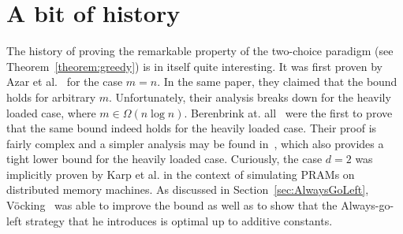 \documentclass[a4paper,12pt]{article}
\begin{document}
\section{A bit of history}
\label{sec:historyOfGreedy}
The history of proving the remarkable property of the two-choice paradigm (see Theorem~\ref{theorem:greedy}) is in itself quite interesting. It was first proven by Azar et al.~\cite{ABKU99} for the case $m = n$. In the same paper, they claimed that the bound holds for arbitrary $m$. Unfortunately, their analysis breaks down for the heavily loaded case, where $m \in \Omega\left(n  \log n\right)$. Berenbrink at. all~\cite{BCSV06} were the first to prove that the same bound indeed holds for the heavily loaded case. Their proof is fairly complex and a simpler analysis may be found in~\cite{TW13}, which also provides a tight lower bound for the heavily loaded case. Curiously, the case $d = 2$ was implicitly proven by Karp et al. in the context of simulating PRAMs on distributed memory machines\cite{KLM92}. As discussed in Section~\ref{sec:AlwaysGoLeft}, V\"ocking~\cite{VOC03} was able to improve the bound as well as to show that the Always-go-left strategy that he introduces is optimal up to additive constants.



 
\end{document}
